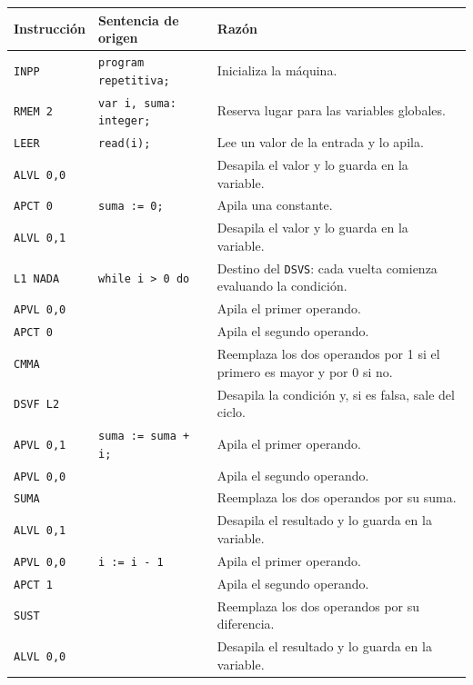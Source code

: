 \documentclass[12pt]{article}
\begin{document}
\begin{longtable}{|p{3.2cm}|p{5cm}|p{7cm}|}
\hline
\textbf{Instrucción} & \textbf{Sentencia de origen} & \textbf{Razón} \\
\hline
\endhead
\texttt{INPP} & \texttt{program repetitiva;} & Inicializa la máquina. \\
\hline
\texttt{RMEM 2} & \texttt{var i, suma: integer;} & Reserva lugar para las variables globales. \\
\hline
\texttt{LEER} & \texttt{read(i);} & Lee un valor de la entrada y lo apila. \\
\hline
\texttt{ALVL 0,0} & \texttt{} & Desapila el valor y lo guarda en la variable. \\
\hline
\texttt{APCT 0} & \texttt{suma := 0;} & Apila una constante. \\
\hline
\texttt{ALVL 0,1} & \texttt{} & Desapila el valor y lo guarda en la variable. \\
\hline
\texttt{L1 NADA} & \texttt{while i > 0 do} & Destino del \texttt{DSVS}: cada vuelta comienza evaluando la condición. \\
\hline
\texttt{APVL 0,0} & \texttt{} & Apila el primer operando. \\
\hline
\texttt{APCT 0} & \texttt{} & Apila el segundo operando. \\
\hline
\texttt{CMMA} & \texttt{} & Reemplaza los dos operandos por 1 si el primero es mayor y por 0 si no. \\
\hline
\texttt{DSVF L2} & \texttt{} & Desapila la condición y, si es falsa, sale del ciclo. \\
\hline
\texttt{APVL 0,1} & \texttt{suma := suma + i;} & Apila el primer operando. \\
\hline
\texttt{APVL 0,0} & \texttt{} & Apila el segundo operando. \\
\hline
\texttt{SUMA} & \texttt{} & Reemplaza los dos operandos por su suma. \\
\hline
\texttt{ALVL 0,1} & \texttt{} & Desapila el resultado y lo guarda en la variable. \\
\hline
\texttt{APVL 0,0} & \texttt{i := i - 1} & Apila el primer operando. \\
\hline
\texttt{APCT 1} & \texttt{} & Apila el segundo operando. \\
\hline
\texttt{SUST} & \texttt{} & Reemplaza los dos operandos por su diferencia. \\
\hline
\texttt{ALVL 0,0} & \texttt{} & Desapila el resultado y lo guarda en la variable. \\

\end{longtable}
\end{document}
